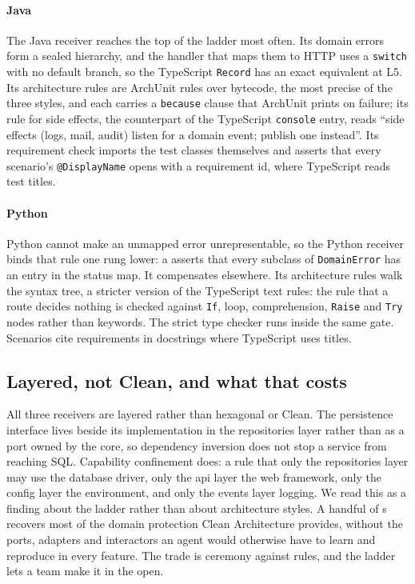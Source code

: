 \paragraph{Java} The Java receiver reaches the top of the ladder most often. Its domain errors
form a sealed hierarchy, and the handler that maps them to HTTP uses a \texttt{switch} with no
default branch, so the TypeScript \texttt{Record} has an exact equivalent at L5. Its
architecture rules are ArchUnit rules over bytecode, the most precise of the three styles, and
each carries a \texttt{because} clause that ArchUnit prints on failure; its rule for side effects,
the counterpart of the TypeScript \texttt{console} entry, reads ``side effects (logs, mail, audit) listen for a domain event; publish one
instead''. Its requirement check imports the test classes themselves and asserts
that every scenario's \texttt{@DisplayName} opens with a requirement id, where TypeScript reads
test titles.

\paragraph{Python} Python cannot make an unmapped error unrepresentable, so the Python receiver
binds that rule one rung lower: a  asserts that every subclass of
\texttt{DomainError} has an entry in the status map. It compensates elsewhere. Its architecture
rules walk the syntax tree, a stricter version of the TypeScript text rules: the rule that a
route decides nothing is checked against \texttt{If}, loop, comprehension, \texttt{Raise} and
\texttt{Try} nodes rather than keywords. The strict type checker runs inside the same gate.
Scenarios cite requirements in docstrings where TypeScript uses titles.

\subsection{Layered, not Clean, and what that costs}

All three receivers are layered rather than hexagonal or Clean. The persistence interface lives
beside its implementation in the repositories layer rather than as a port owned by the core, so
dependency inversion does not stop a service from reaching SQL. Capability confinement does:
a rule that only the repositories layer may use the database driver, only the api layer the web
framework, only the config layer the environment, and only the events layer logging. We read
this as a finding about the ladder rather than about architecture styles. A handful of
s recovers most of the domain protection Clean Architecture provides,
without the ports, adapters and interactors an agent would otherwise have to learn and
reproduce in every feature. The trade is ceremony against rules, and the ladder lets a team make
it in the open.

